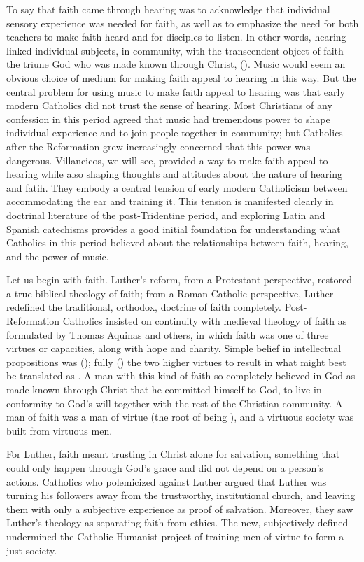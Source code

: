 To say that faith came through hearing was to acknowledge that individual sensory experience was needed for faith, as well as to emphasize the need for both teachers to make faith heard and for disciples to listen.
In other words, hearing linked individual subjects, in community, with the transcendent object of faith---the triune God who was made known through Christ,  ().
Music would seem an obvious choice of medium for making faith appeal to hearing in this way.
But the central problem for using music to make faith appeal to hearing was that early modern Catholics did not trust the sense of hearing.
Most Christians of any confession in this period agreed that music had tremendous power to shape individual experience and to join people together in community; but Catholics after the Reformation grew increasingly concerned that this power was dangerous.
Villancicos, we will see, provided a way to make faith appeal to hearing while also shaping thoughts and attitudes about the nature of hearing and fatih.
They embody a central tension of early modern Catholicism between accommodating the ear and training it.
This tension is manifested clearly in doctrinal literature of the post-Tridentine period, and exploring Latin and Spanish catechisms provides a good initial foundation for understanding what Catholics in this period believed about the relationships between faith, hearing, and the power of music.

Let us begin with faith.
Luther's reform, from a Protestant perspective, restored a true biblical theology of faith; from a Roman Catholic perspective, Luther redefined the traditional, orthodox, doctrine of faith completely.
Post-Reformation Catholics insisted on continuity with medieval theology of faith as formulated by Thomas Aquinas and others, in which faith was one of three virtues or capacities, along with hope and charity.
Simple belief in intellectual propositions was  (); fully  ()  the two higher virtues to result in what might best be translated as .
A man with this kind of faith so completely believed in God as made known through Christ that he committed himself to God, to live in conformity to God's will together with the rest of the Christian community.
A man of faith was a man of virtue (the root of  being ), and a virtuous society was built from virtuous men.

For Luther, faith meant trusting in Christ alone for salvation, something that could only happen through God's grace and did not depend on a person's actions.
Catholics who polemicized against Luther argued that Luther was turning his followers away from the trustworthy, institutional church, and leaving them with only a subjective experience as proof of salvation.
Moreover, they saw Luther's theology as separating faith from ethics.
The new, subjectively defined  undermined the Catholic Humanist project of training men of virtue to form a just society.



